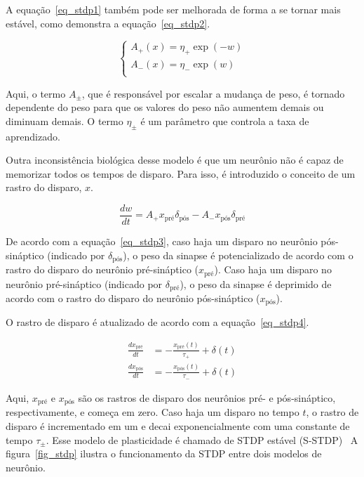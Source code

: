 A equação~\ref{eq_stdp1} também pode ser melhorada de forma a se tornar mais estável, como demonstra a equação~\ref{eq_stdp2}.

\begin{equation}
\label{eq_stdp2}
\begin{cases}
    A_{+}(x) = \eta_{+} \exp(-w)\\
    A_{-}(x) = \eta_{-} \exp(w)\\
\end{cases}
\end{equation}

Aqui, o termo $A_{\pm}$, que é responsável por escalar a mudança de peso, é tornado dependente do peso para que os valores do peso
não aumentem demais ou diminuam demais. O termo $\eta_{\pm}$ é um parâmetro que controla a taxa de aprendizado.

Outra inconsistência biológica desse modelo é que um neurônio não é capaz de memorizar todos os tempos de disparo. Para isso, é
introduzido o conceito de um rastro do disparo, $x$.

\begin{equation}
\label{eq_stdp3}
\frac{dw}{dt} = A_{+} x_{\text{pré}} \delta_{\text{pós}} - A_{-} x_{\text{pós}} \delta_{\text{pré}}
\end{equation}

De acordo com a equação~\ref{eq_stdp3}, caso haja um disparo no neurônio pós-sináptico (indicado por $\delta_{\text{pós}}$), o peso da
sinapse é potencializado de acordo com o rastro do disparo do neurônio pré-sináptico ($x_{\text{pré}}$). Caso haja um disparo no
neurônio pré-sináptico (indicado por $\delta_{\text{pré}}$), o peso da sinapse é deprimido de acordo com o rastro do disparo do neurônio
pós-sináptico ($x_{\text{pós}}$).

O rastro de disparo é atualizado de acordo com a equação~\ref{eq_stdp4}.

\begin{align}
\label{eq_stdp4}
\frac{dx_{\text{pré}}}{dt} &= -\frac{x_{\text{pré}}(t)}{\tau_{+}}+\delta(t)\\
\frac{dx_{\text{pós}}}{dt} &= -\frac{x_{\text{pós}}(t)}{\tau_{-}}+\delta(t)
\end{align}

Aqui, $x_{\text{pré}}$ e $x_{\text{pós}}$ são os rastros de disparo dos neurônios pré- e pós-sináptico, respectivamente, e começa
em zero. Caso haja um disparo no tempo $t$, o rastro de disparo é incrementado em um e decai exponencialmente com uma constante de
tempo $\tau_{\pm}$. Esse modelo de plasticidade é chamado de STDP estável (S-STDP)~\cite{paredes-vallesUnsupervised2018} A
figura~\ref{fig_stdp} ilustra o funcionamento da STDP entre dois modelos de neurônio.

